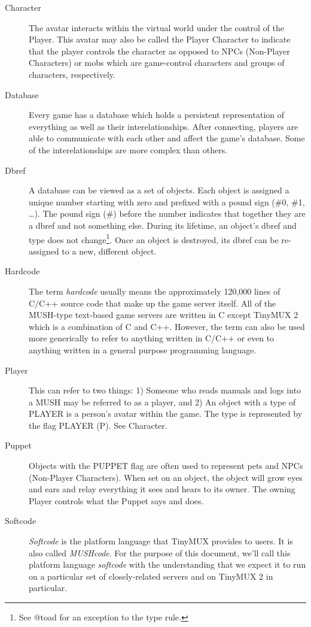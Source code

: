 \documentclass[10pt,letterpaper]{book}
\begin{document}
\begin{description}
\item[Character]
The avatar interacts within the virtual world under the
control of the Player.
This avatar may also be called the Player Character to indicate that the
player controls the character as opposed to NPCs (Non-Player Characters) or
mobs which are game-control characters and groups of characters, respectively.

\item[Database]
Every game has a database which holds a persistent representation of
everything as well as their interelationships.
After connecting, players are able to communicate with each other and affect
the game's database.
Some of the interelationships are more complex than others.

\item[Dbref]
A database can be viewed as a set of objects.
Each object is assigned a unique number starting with zero and prefixed with
a pound sign (\#0, \#1, \ldots).
The pound sign (\#) before the number indicates that together they are a dbref
and not something else.
During its lifetime, an object's dbref and type does not change\footnote{See @toad
for an exception to the type rule.}.
Once an object is destroyed, its dbref can be re-assigned to a new,
different object.

\item[Hardcode]
The term \emph{hardcode} usually means the approximately 120,000 lines of C/C++
source code that make up the game server itself.
All of the MUSH-type text-based game servers are written in C except
TinyMUX 2 which is a combination of C and C++.
However, the term can also be used more generically to refer to anything
written in C/C++ or even to anything written in a general purpose programming
language.

\item[Player]
This can refer to two things: 1) Someone who reads manuals and
logs into a MUSH may be referred to as a player, and 2) An object with a type of
PLAYER is a person's avatar within the game.
The type is represented by the flag PLAYER (P).
See Character.

\item[Puppet]
Objects with the PUPPET flag are often used to represent pets and NPCs
(Non-Player Characters).
When set on an object, the object will grow eyes and ears and relay everything
it sees and hears to its owner. The owning Player controls what the Puppet
says and does.

\item[Softcode]
\emph{Softcode} is the platform language that TinyMUX provides to users.
It is also called \emph{MUSHcode}.
For the purpose of this document, we'll call this platform language
\emph{softcode} with the understanding that we expect it to run on a
particular set of closely-related servers and on TinyMUX 2 in
particular.

\end{description}
\end{document}
